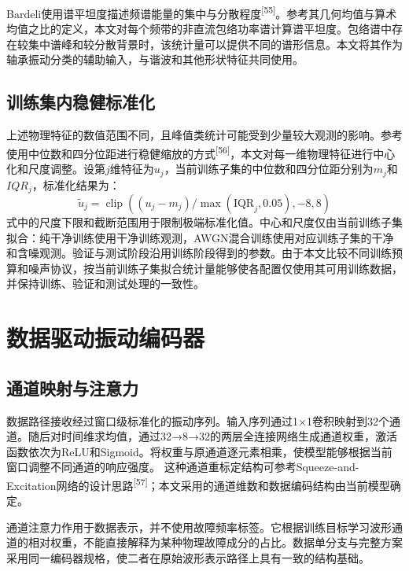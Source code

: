 \documentclass[UTF8,12pt,openany,twoside]{ctexbook}
\numberwithin{equation}{chapter}
\begin{document}
Bardeli使用谱平坦度描述频谱能量的集中与分散程度\textsuperscript{[55]}。参考其几何均值与算术均值之比的定义，本文对每个频带的非直流包络功率谱计算谱平坦度。包络谱中存在较集中谱峰和较分散背景时，该统计量可以提供不同的谱形信息。本文将其作为轴承振动分类的辅助输入，与谐波和其他形状特征共同使用。

\subsection{训练集内稳健标准化}\label{ux8badux7ec3ux96c6ux5185ux7a33ux5065ux6807ux51c6ux5316}


上述物理特征的数值范围不同，且峰值类统计可能受到少量较大观测的影响。参考使用中位数和四分位距进行稳健缩放的方式\textsuperscript{[56]}，本文对每一维物理特征进行中心化和尺度调整。设第$j$维特征为$u_j$，当前训练子集的中位数和四分位距分别为$m_j$和$IQR_j$，标准化结果为：
\begin{equation}
\label{eq:auto08}
\tilde u_j=\operatorname{clip}\left((u_j-m_j)/\max(\mathrm{IQR}_j,0.05),-8,8\right)
\end{equation}
式中的尺度下限和截断范围用于限制极端标准化值。中心和尺度仅由当前训练子集拟合：纯干净训练使用干净训练观测，AWGN混合训练使用对应训练子集的干净和含噪观测。验证与测试阶段沿用训练阶段得到的参数。由于本文比较不同训练预算和噪声协议，按当前训练子集拟合统计量能够使各配置仅使用其可用训练数据，并保持训练、验证和测试处理的一致性。

\section{数据驱动振动编码器}\label{ux6570ux636eux9a71ux52a8ux632fux52a8ux7f16ux7801ux5668}

\subsection{通道映射与注意力}\label{ux901aux9053ux6620ux5c04ux4e0eux6ce8ux610fux529b}

数据路径接收经过窗口级标准化的振动序列。输入序列通过1×1卷积映射到32个通道。随后对时间维求均值，通过32→8→32的两层全连接网络生成通道权重，激活函数依次为ReLU和Sigmoid。将权重与原通道逐元素相乘，使模型能够根据当前窗口调整不同通道的响应强度。 这种通道重标定结构可参考Squeeze-and-Excitation网络的设计思路\textsuperscript{[57]}；本文采用的通道维数和数据编码结构由当前模型确定。

通道注意力作用于数据表示，并不使用故障频率标签。它根据训练目标学习波形通道的相对权重，不能直接解释为某种物理故障成分的占比。数据单分支与完整方案采用同一编码器规格，使二者在原始波形表示路径上具有一致的结构基础。
\end{document}
